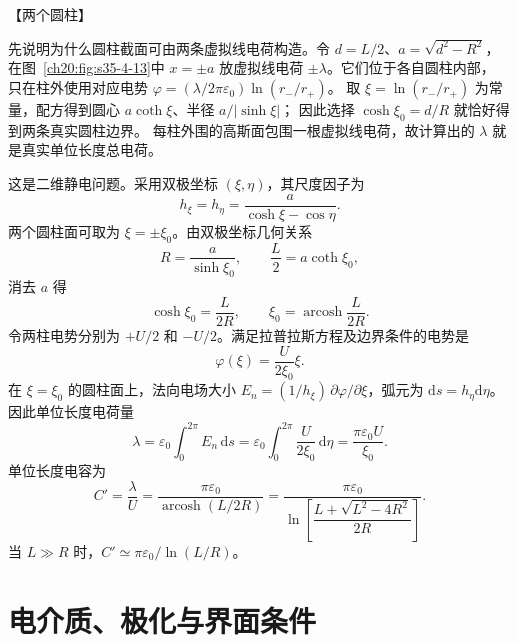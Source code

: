 {\begin{origexamplebox}{【两个圆柱】}
\begin{center}
\begin{tikzpicture}[>=Latex,scale=.8]
\end{tikzpicture}\end{center}
\label{ch20:fig:em-source-thirty-fifth-section-3}
\end{origexamplebox}\par\nopagebreak[4]

\par\noindent\begin{minipage}{\linewidth}
\twoCylindersFigure
{}\label{ch20:fig:s35-4-13}
\end{minipage}\par\medskip

\begin{xesolution}
\ThACylinders

先说明为什么圆柱截面可由两条虚拟线电荷构造。令 $d=L/2$、$a=\sqrt{d^2-R^2}$，
在图~\ref{ch20:fig:s35-4-13}中 $x=\pm a$ 放虚拟线电荷 $\pm\lambda$。它们位于各自圆柱内部，
只在柱外使用对应电势 $\varphi=(\lambda/2\pi\varepsilon_0)\ln(r_-/r_+)$。
取 $\xi=\ln(r_-/r_+)$ 为常量，配方得到圆心 $a\coth\xi$、半径 $a/|\sinh\xi|$；
因此选择 $\cosh\xi_0=d/R$ 就恰好得到两条真实圆柱边界。
每柱外围的高斯面包围一根虚拟线电荷，故计算出的 $\lambda$ 就是真实单位长度总电荷。

这是二维静电问题。采用双极坐标 $(\xi,\eta)$，其尺度因子为
\[
 h_\xi=h_\eta=\frac a{\cosh\xi-\cos\eta}.
\]
两个圆柱面可取为 $\xi=\pm\xi_0$。由双极坐标几何关系
\[
 R=\frac a{\sinh\xi_0},\qquad
 \frac L2=a\coth\xi_0,
\]
消去 $a$ 得
\[
 \cosh\xi_0=\frac{L}{2R},\qquad
 \xi_0=\operatorname{arcosh}\frac{L}{2R}.
\]
令两柱电势分别为 $+U/2$ 和 $-U/2$。满足拉普拉斯方程及边界条件的电势是
\[
 \varphi(\xi)=\frac{U}{2\xi_0}\xi.
\]
在 $\xi=\xi_0$ 的圆柱面上，法向电场大小
$E_n=(1/h_\xi)\,\partial\varphi/\partial\xi$，弧元为
$\mathrm ds=h_\eta\mathrm d\eta$。因此单位长度电荷量
\[
 \lambda=\varepsilon_0\int_0^{2\pi}E_n\,\mathrm ds
 =\varepsilon_0\int_0^{2\pi}\frac{U}{2\xi_0}\,\mathrm d\eta
 =\frac{\pi\varepsilon_0U}{\xi_0}.
\]
单位长度电容为
\[
 \boxed{C'=\frac\lambda U
 =\frac{\pi\varepsilon_0}{\operatorname{arcosh}(L/2R)}
 =\frac{\pi\varepsilon_0}
 {\ln\!\left[\dfrac{L+\sqrt{L^2-4R^2}}{2R}\right]}}.
\]
当 $L\gg R$ 时，$C'\simeq\pi\varepsilon_0/\ln(L/R)$。
\end{xesolution}



\section{电介质、极化与界面条件}

}
